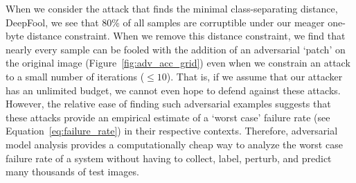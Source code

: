 \documentclass[journal]{IEEEtran}
\begin{document}
When we consider the attack that finds the minimal class-separating distance, DeepFool, we see that 80\% of all samples are corruptible under our meager one-byte distance constraint. When we remove this distance constraint, we find that nearly every sample can be fooled with the addition of an adversarial `patch' on the original image (Figure~\ref{fig:adv_acc_grid}) even when we constrain an attack to a small number of iterations ($\leq 10$). That is, if we assume that our attacker has an unlimited budget, we cannot even hope to defend against these attacks. However, the relative ease of finding such adversarial examples suggests that these attacks provide an empirical estimate of a `worst case' failure rate (see Equation~\ref{eq:failure_rate}) in their respective contexts. Therefore, adversarial model analysis provides a computationally cheap way to analyze the worst case failure rate of a system without having to collect, label, perturb, and predict many thousands of test images.
\end{document}
